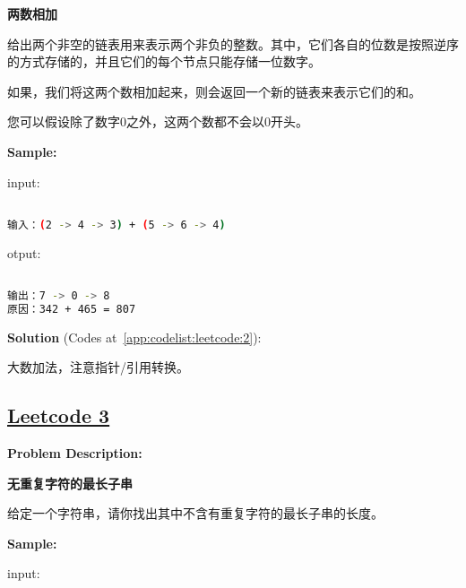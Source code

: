\textbf{两数相加}\par

给出两个非空的链表用来表示两个非负的整数。其中，它们各自的位数是按照逆序的方式存储的，并且它们的每个节点只能存储一位数字。\par

如果，我们将这两个数相加起来，则会返回一个新的链表来表示它们的和。\par

您可以假设除了数字0之外，这两个数都不会以0开头。\par


\textbf{Sample:}\par

input:\par

\begin{lstlisting}[language=bash]

输入：(2 -> 4 -> 3) + (5 -> 6 -> 4)


\end{lstlisting}

otput:\par

\begin{lstlisting}[language=bash]

输出：7 -> 0 -> 8
原因：342 + 465 = 807


\end{lstlisting}

\textbf{Solution }(Codes at~\ref{app:codelist:leetcode:2}):\par

大数加法，注意指针/引用转换。\par



\subsection{\href{https://leetcode-cn.com/}{Leetcode 3}}\label{app:problemlist:leetcode:3}

\textbf{Problem Description:}\par

\textbf{无重复字符的最长子串}\par

给定一个字符串，请你找出其中不含有重复字符的最长子串的长度。\par


\textbf{Sample:}\par

input:\par

